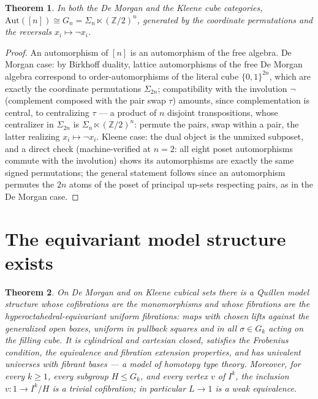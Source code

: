 \documentclass[11pt]{amsart}
\newtheorem{thm}{Theorem}[section]
\theoremstyle{definition}
\newcommand{\G}{G}
\newcommand{\Ldash}{L}
\begin{document}
\begin{thm}
  \label{thm:aut}
  In both the De Morgan and the Kleene cube categories,
  $\mathrm{Aut}([n]) \cong \G_n = \Sigma_n \ltimes
  (\mathbb{Z}/2)^n$, generated by the coordinate permutations and
  the reversals $x_i \mapsto \neg x_i$.
\end{thm}

\begin{proof}
  An automorphism of $[n]$ is an automorphism of the free algebra.
  De Morgan case: by Birkhoff duality, lattice automorphisms of the
  free De Morgan algebra correspond to order-automorphisms of the
  literal cube $\{0,1\}^{2n}$, which are exactly the coordinate
  permutations $\Sigma_{2n}$; compatibility with the involution
  $\neg$ (complement composed with the pair swap $\tau$) amounts,
  since complementation is central, to centralizing $\tau$ --- a
  product of $n$ disjoint transpositions, whose centralizer in
  $\Sigma_{2n}$ is $\Sigma_n \ltimes (\mathbb{Z}/2)^n$: permute
  the pairs, swap within a pair, the latter realizing
  $x_i \mapsto \neg x_i$.  Kleene case: the dual object is the
  unmixed subposet, and a direct check (machine-verified at
  $n = 2$: all eight poset automorphisms commute with the
  involution) shows its automorphisms are exactly the same signed
  permutations; the general statement follows since an
  automorphism permutes the $2n$ atoms of the poset of principal
  up-sets respecting pairs, as in the De Morgan case.
\end{proof}

\section{The equivariant model structure exists}
\label{sec:eqms}

\begin{thm}
  \label{thm:eqms}
  On De Morgan and on Kleene cubical sets there is a Quillen model
  structure whose cofibrations are the monomorphisms and whose
  fibrations are the hyperoctahedral-equivariant uniform
  fibrations: maps with chosen lifts against the generalized open
  boxes, uniform in pullback squares and in all
  $\sigma \in \G_k$ acting on the filling cube.  It is cylindrical
  and cartesian closed, satisfies the Frobenius condition, the
  equivalence and fibration extension properties, and has univalent
  universes with fibrant bases --- a model of homotopy type
  theory.  Moreover, for every $k \geq 1$, every subgroup
  $H \leq \G_k$, and every vertex $v$ of $I^k$, the inclusion
  $v : 1 \to I^k/H$ is a trivial cofibration; in particular
  $\Ldash \to 1$ is a weak equivalence.
\end{thm}
\end{document}
